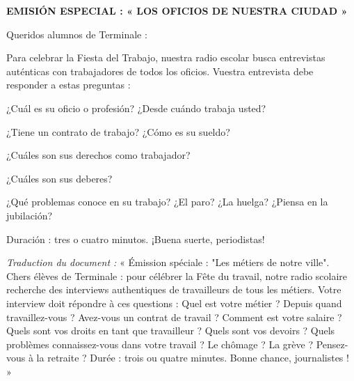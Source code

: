 \documentclass[11pt]{article}
\newcounter{popsec}
\newcounter{popsub}
\newcommand{\courssub}[1]{%
  \stepcounter{popsub}%
  \par\vspace{9pt}\noindent{\popxbold\fontsize{11.5}{13}\selectfont\color{popink}{\color{poporange}\thepopsec.\thepopsub}\hspace{6pt}#1}\par\nopagebreak\vspace{4pt}
}
\begin{document}
\begin{textebox}
\textbf{EMISIÓN ESPECIAL : « LOS OFICIOS DE NUESTRA CIUDAD »}\par
\medskip
Queridos alumnos de Terminale :\par
Para celebrar la Fiesta del Trabajo, nuestra radio escolar busca entrevistas auténticas con trabajadores de todos los oficios. Vuestra entrevista debe responder a estas preguntas :\par
¿Cuál es su oficio o profesión? ¿Desde cuándo trabaja usted?\par
¿Tiene un contrato de trabajo? ¿Cómo es su sueldo?\par
¿Cuáles son sus derechos como trabajador?\par
¿Cuáles son sus deberes?\par
¿Qué problemas conoce en su trabajo? ¿El paro? ¿La huelga? ¿Piensa en la jubilación?\par
\medskip
Duración : tres o cuatro minutos. ¡Buena suerte, periodistas!
\end{textebox}

\emph{Traduction du document :} « Émission spéciale : "Les métiers de notre ville". Chers élèves de Terminale : pour célébrer la Fête du travail, notre radio scolaire recherche des interviews authentiques de travailleurs de tous les métiers. Votre interview doit répondre à ces questions : Quel est votre métier ? Depuis quand travaillez-vous ? Avez-vous un contrat de travail ? Comment est votre salaire ? Quels sont vos droits en tant que travailleur ? Quels sont vos devoirs ? Quels problèmes connaissez-vous dans votre travail ? Le chômage ? La grève ? Pensez-vous à la retraite ? Durée : trois ou quatre minutes. Bonne chance, journalistes ! »

\courssub{Consignes}
\end{document}
